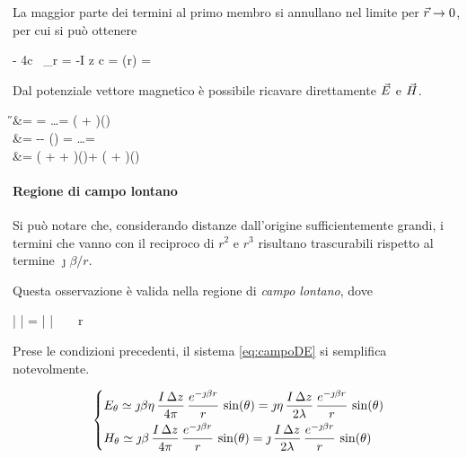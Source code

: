 La maggior parte dei termini al primo membro si annullano nel limite per $\vec{r} \to 0$, per cui si può ottenere
\begin{esp} \label{eq:A_DE}
	- 4\pi c \, \lim_{r } \ejbrp = -\mu I \Delta z
	\implies c = 
	\implies \A(r) =   \hz
\end{esp}

Dal potenziale vettore magnetico è possibile ricavare direttamente $\vec{E}$ e $\vec{H}$.

\begin{esp}\label{eq:campoDE}
	\H &=  \rot \A = \ldots =  \left( + \right)\ejbr \sin(\theta)\hphi\\
	\E &= -\jmath\omega\A - \nabla \left(\frac{\diverg\A}{-\jmath\omega\mu\epsilon}\right) = \ldots = \\
	&= \eta {} \left( +  + \right)\ejbrp \sin(\theta)\hth +
	\eta {} \left(  + \right)\ejbr \cos(\theta)\hr
\end{esp}

\paragraph{Regione di campo lontano}
Si può notare che, considerando distanze dall'origine sufficientemente grandi, i termini che vanno con il reciproco di $r^2$ e $r^3$ risultano trascurabili rispetto al termine $\jmath \beta / r$.

Questa osservazione è valida nella regione di \emph{campo lontano}, dove
\begin{esp*}
	\left|  \right|
	= \left|  \right|
	\gg {} ~ \Leftrightarrow ~ r \gg \lambda
\end{esp*}

Prese le condizioni precedenti, il sistema \autoref{eq:campoDE} si semplifica notevolmente.

\begin{equation}\begin{dcases}
	E_\theta \simeq \jmath\beta\eta\,\frac{I \, \Delta z}{4\pi} \, \frac{e^{-\jmath \beta r}}{r} \, \sin(\theta) = \jmath \eta\,\frac{I \, \Delta z}{2\lambda} \, \frac{e^{-\jmath \beta r}}{r} \, \sin(\theta) \\
	H_\theta \simeq \jmath\beta\,\frac{I \, \Delta z}{4\pi} \, \frac{e^{-\jmath \beta r}}{r} \, \sin(\theta) = \jmath \,\frac{I \, \Delta z}{2\lambda} \, \frac{e^{-\jmath \beta r}}{r} \, \sin(\theta) \\
\end{dcases}\end{equation}


